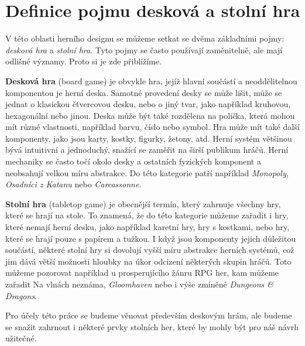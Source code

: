 \section{Definice pojmu desková a stolní hra}
\label{subsec:boardgame_definition}

V této oblasti herního designu se můžeme setkat se dvěma základními pojmy: \textit{desková hra} a \textit{stolní hra}. Tyto pojmy se často používají zaměnitelně, ale mají odlišné významy. Proto si je zde přiblížíme.

\textbf{Desková hra} (board game) je obvykle hra, jejíž hlavní součástí a neoddělitelnou komponentou je herní deska. Samotné provedení desky se může lišit, může se jednat o klasickou čtvercovou desku, nebo o jiný tvar, jako například kruhovou, hexagonální nebo jinou. Deska může být také rozdělena na políčka, která mohou mít různé vlastnosti, například barvu, číslo nebo symbol. Hra může mít také další komponenty, jako jsou karty, kostky, figurky, žetony, atd. Herní systém většinou bývá intuitivní a jednoduchý, snažící se zaměřit na širší publikum hráčů. Herní mechaniky se často točí okolo desky a ostatních fyzických komponent a neobsahují velkou míru abstrakce. Do této kategorie patří například \textit{Monopoly}, \textit{Osadníci z Katanu} nebo \textit{Carcassonne}. \cite{board_game_supply_2023}

\textbf{Stolní hra} (tabletop game) je obecnější termín, který zahrnuje všechny hry, které se hrají na stole. To znamená, že do této kategorie můžeme zařadit i hry, které nemají herní desku, jako například karetní hry, hry s kostkami, nebo hry, které se hrají pouze s papírem a tužkou. I když jsou komponenty jejich důležitou součástí, některé stolní hry si dovolují vyšší míru abstrakce herních systémů, což jim dává větší možnosti hloubky na úkor odcizení některých skupin hráčů. Toto můžeme pozorovat například u prosperujícího žánru RPG her, kam můžeme zařadit Na vlnách neznáma, \textit{Gloomhaven} nebo i výše zmíněné \textit{Dungeons \& Dragons}. \cite{board_game_supply_2023}

Pro účely této práce se budeme věnovat především deskovým hrám, ale budeme se snažit zahrnout i některé prvky stolních her, které by mohly být pro náš návrh užitečné.